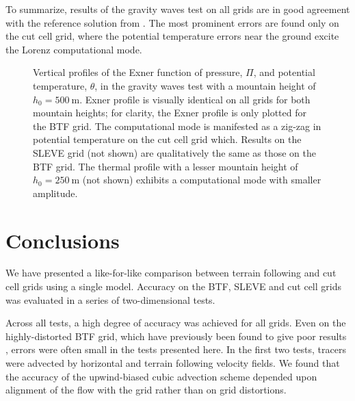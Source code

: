 \documentclass[twocol]{ametsoc}
\begin{document}
To summarize, results of the gravity waves test on all grids are in good agreement with the reference solution from \citet{melvin2010}.  The most prominent errors are found only on the cut cell grid, where the potential temperature errors near the ground excite the Lorenz computational mode.

\begin{figure*}
	\centering
%
	\caption{Anomalies in potential temperature in the gravity waves test after 5 hours with a mountain height, \(h_0 = \SI{250}{\meter}\).  The central domain in the lowest \SI{12}{\kilo\meter} is shown on (a) the BTF grid, and (c) the cut cell grid.  The four lowest layers of each grid are shown for (b) BTF, and (d) cut cell grids, using a narrower potential temperature scale.  The results on the SLEVE grid (not shown) are qualitatively identical to results on the BTF grid.}
	\label{fig:gw-theta}
\end{figure*}

\begin{figure}
	\centering
%
	\caption{Vertical profiles of the Exner function of pressure, \(\Pi\), and potential temperature, \(\theta\), in the gravity waves test with a mountain height of \(h_0 = \SI{500}{\meter}\).  Exner profile is visually identical on all grids for both mountain heights; for clarity, the Exner profile is only plotted for the BTF grid.  The computational mode is manifested as a zig-zag in potential temperature on the cut cell grid which.   Results on the SLEVE grid (not shown) are qualitatively the same as those on the BTF grid.  The thermal profile with a lesser mountain height of \(h_0 = \SI{250}{\meter}\) (not shown) exhibits a computational mode with smaller amplitude.}
	\label{fig:gw-exner-theta}
\end{figure}

\section{Conclusions}
We have presented a like-for-like comparison between terrain following and cut cell grids using a single model.  Accuracy on the BTF, SLEVE and cut cell grids was evaluated in a series of two-dimensional tests.

Across all tests, a high degree of accuracy was achieved for all grids.  Even on the highly-distorted BTF grid, which have previously been found to give poor results \citep{schaer2002,klemp2011,good2014}, errors were often small in the tests presented here.  In the first two tests, tracers were advected by horizontal and terrain following velocity fields.  We found that the accuracy of the upwind-biased cubic advection scheme depended upon alignment of the flow with the grid rather than on grid distortions.
\end{document}
